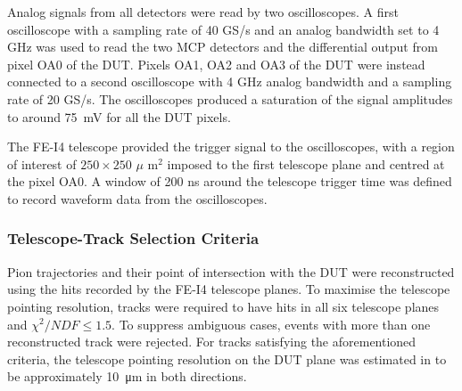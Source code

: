 		Analog signals from all detectors were read by two oscilloscopes. A first oscilloscope with a sampling rate of 40 GS/s and an analog bandwidth set to 4 GHz was used to read the two MCP detectors and the differential output from pixel OA0 of the DUT. Pixels OA1, OA2 and OA3 of the DUT were instead connected to a second oscilloscope with 4 GHz analog bandwidth and a sampling rate of 20 GS/s. The oscilloscopes produced a saturation of the signal amplitudes to around \SI{75}{\milli\volt} for all the DUT pixels. 

		The FE-I4 telescope provided the trigger signal to the oscilloscopes, with a region of interest of $250 \times 250 $ $\mu$ m$^2$ imposed to the first telescope plane and centred at the pixel OA0. A window of 200 ns around the telescope trigger time was defined to record waveform data from the oscilloscopes.  


		\subsubsection{Telescope-Track Selection Criteria}
		Pion trajectories and their point of intersection with the DUT were reconstructed using the hits recorded by the FE-I4 telescope planes. To maximise the telescope pointing resolution, tracks were required to have hits in all six telescope planes and $ \chi^{2}/NDF \le 1.5 $. To suppress ambiguous cases, events with more than one reconstructed track were rejected. For tracks satisfying the aforementioned criteria, the telescope pointing resolution on the DUT plane was estimated in \cite{vicente_thesis} to be approximately \SI{10}{\um} in both directions.
		
